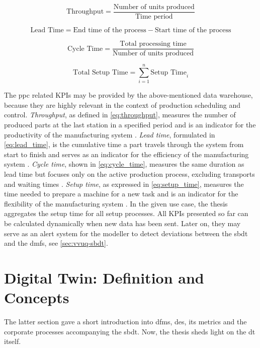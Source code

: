 \begin{equation}
  \text{Throughput} = \frac{\text{Number of units produced}}{\text{Time period}}
  \label{eq:throughput}
\end{equation}

\begin{equation}
  \text{Lead Time} = \text{End time of the process} - \text{Start time of the process}
  \label{eq:lead_time}
\end{equation}

\begin{equation}
  \text{Cycle Time} = \frac{\text{Total processing time}}{\text{Number of units produced}}
  \label{eq:cycle_time}
\end{equation}

\begin{equation}
  \text{Total Setup Time} = \sum_{i=1}^{n} \text{Setup Time}_i
  \label{eq:setup_time}
\end{equation}

The \gls{ppc} related KPIs may be provided by the above-mentioned data warehouse, because they are highly relevant in the context of production scheduling and control. \textit{Throughput}, as defined in \autoref{eq:throughput}, measures the number of produced parts at the last station in a specified period and is an indicator for the productivity of the manufacturing system \autocite{hopp2011factory, imseitif2019throughput}. \textit{Lead time}, formulated in \autoref{eq:lead_time}, is the cumulative time a part travels through the system from start to finish and serves as an indicator for the efficiency of the manufacturing system \autocite{slack2010operations, pfeiffer2016manufacturing}. \textit{Cycle time}, shown in \autoref{eq:cycle_time}, measures the same duration as lead time but focuses only on the active production process, excluding transports and waiting times \autocite{goldratt2004goal, griffin1993metrics}. \textit{Setup time}, as expressed in \autoref{eq:setup_time}, measures the time needed to prepare a machine for a new task and is an indicator for the flexibility of the manufacturing system \autocite{allahverdi1999review, allahverdi2008significance}. In the given use case, the thesis aggregates the setup time for all setup processes. All KPIs presented so far can be calculated dynamically when new data has been sent. Later on, they may serve as an alert system for the modeller to detect deviations between the \gls{sbdt} and the \gls{dmfs}, see \autoref{sec:vvuq-sbdt}.

\section{Digital Twin: Definition and Concepts}
\label{sec:digital-twin}
The latter section gave a short introduction into \gls{dfms}, \gls{des}, its metrics and the corporate processes accompanying the \gls{sbdt}. Now, the thesis sheds light on the \gls{dt} itself.

